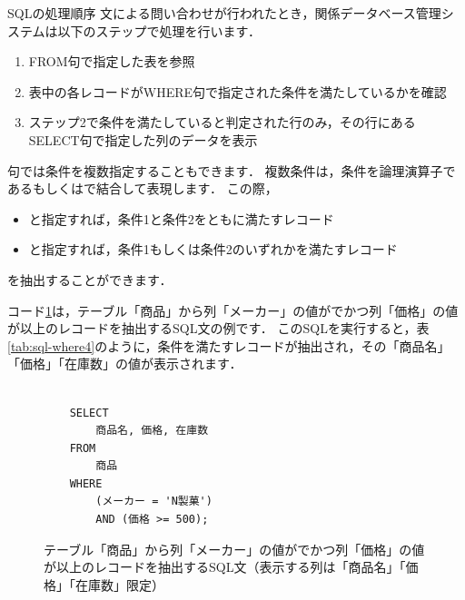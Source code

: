 \begin{notebox}{SQLの処理順序}
    文による問い合わせが行われたとき，関係データベース管理システムは以下のステップで処理を行います．
    \begin{enumerate}
    \item FROM句で指定した表を参照
    \item 表中の各レコードがWHERE句で指定された条件を満たしているかを確認
    \item ステップ2で条件を満たしていると判定された行のみ，その行にあるSELECT句で指定した列のデータを表示
    \end{enumerate}
\end{notebox}

句では条件を複数指定することもできます．
複数条件は，条件を論理演算子であるもしくはで結合して表現します．
この際，
\begin{itemize}
\item {}と指定すれば，条件1と条件2をともに満たすレコード
\item {}と指定すれば，条件1もしくは条件2のいずれかを満たすレコード
\end{itemize}
を抽出することができます．

コード\ref{code:sql-where4}は，テーブル「商品」から列「メーカー」の値がでかつ列「価格」の値が以上のレコードを抽出するSQL文の例です．
このSQLを実行すると，表\ref{tab:sql-where4}のように，条件を満たすレコードが抽出され，その「商品名」「価格」「在庫数」の値が表示されます．
\begin{figure}[!htbp]
    \begin{verbatim}

    SELECT
        商品名, 価格, 在庫数
    FROM
        商品
    WHERE
        (メーカー = 'N製菓')
        AND (価格 >= 500);

    \end{verbatim}
    \captionsetup{name=コード}
    \caption{テーブル「商品」から列「メーカー」の値がでかつ列「価格」の値が以上のレコードを抽出するSQL文（表示する列は「商品名」「価格」「在庫数」限定）}
    \label{code:sql-where4}
\end{figure}
\begin{table}[!htbp]
    \centering
    \caption{テーブル「商品」から列「メーカー」の値がでかつ列「価格」の値が以上のレコードを抽出し，列「商品名」「価格」「在庫数」の値を表示した結果}
    \label{tab:sql-where4}
\end{table}

